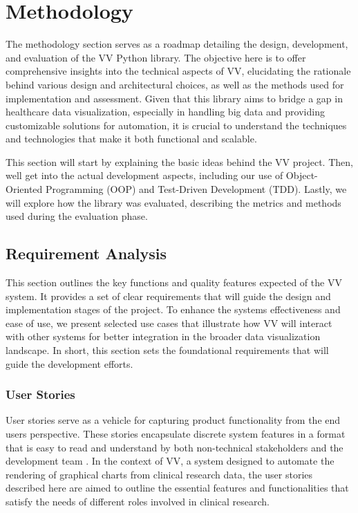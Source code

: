 \section{Methodology}\label{methodology}

The methodology section serves as a roadmap detailing the design,
development, and evaluation of the VV Python library. The objective here
is to offer comprehensive insights into the technical aspects of VV,
elucidating the rationale behind various design and architectural
choices, as well as the methods used for implementation and assessment.
Given that this library aims to bridge a gap in healthcare data
visualization, especially in handling big data and providing
customizable solutions for automation, it is crucial to understand the
techniques and technologies that make it both functional and scalable.

This section will start by explaining the basic ideas behind the VV
project. Then, we\textquotesingle ll get into the actual development
aspects, including our use of Object-Oriented Programming (OOP) and
Test-Driven Development (TDD). Lastly, we will explore how the library
was evaluated, describing the metrics and methods used during the
evaluation phase.

\subsection{Requirement Analysis}\label{requirement-analysis}

This section outlines the key functions and quality features expected of
the VV system. It provides a set of clear requirements that will guide
the design and implementation stages of the project. To enhance the
system\textquotesingle s effectiveness and ease of use, we present
selected use cases that illustrate how VV will interact with other
systems for better integration in the broader data visualization
landscape. In short, this section sets the foundational requirements
that will guide the development efforts.

\subsubsection{User Stories}\label{user-stories}

User stories serve as a vehicle for capturing product functionality from
the end user\textquotesingle s perspective. These stories encapsulate
discrete system features in a format that is easy to read and understand
by both non-technical stakeholders and the development team
\cite{37}\cite{38}. In the
context of VV, a system designed to automate the rendering of graphical
charts from clinical research data, the user stories described here are
aimed to outline the essential features and functionalities that satisfy
the needs of different roles involved in clinical research.

